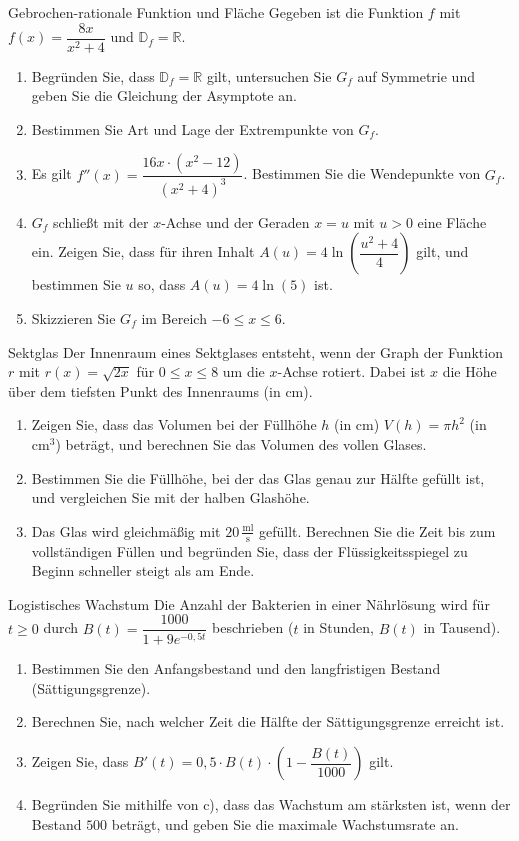 \begin{uebung}{Gebrochen-rationale Funktion und Fläche}
Gegeben ist die Funktion $f$ mit $f(x) = \dfrac{8x}{x^2+4}$ und $\mathds{D}_f = \mathds{R}$.
\begin{enumerate}[label=\alph*)]
  \item Begründen Sie, dass $\mathds{D}_f = \mathds{R}$ gilt, untersuchen Sie $G_f$ auf Symmetrie und geben Sie die Gleichung der Asymptote an.
  \item Bestimmen Sie Art und Lage der Extrempunkte von $G_f$.
  \item Es gilt $f''(x) = \dfrac{16x\cdot(x^2-12)}{(x^2+4)^3}$. Bestimmen Sie die Wendepunkte von $G_f$.
  \item $G_f$ schließt mit der $x$-Achse und der Geraden $x=u$ mit $u>0$ eine Fläche ein. Zeigen Sie, dass für ihren Inhalt $A(u) = 4\ln{\left(\dfrac{u^2+4}{4}\right)}$ gilt, und bestimmen Sie $u$ so, dass $A(u) = 4\ln{(5)}$ ist.
  \item Skizzieren Sie $G_f$ im Bereich $-6\leq x\leq 6$.
\end{enumerate}
\end{uebung}

\begin{uebung}{Sektglas}
Der Innenraum eines Sektglases entsteht, wenn der Graph der Funktion $r$ mit $r(x) = \sqrt{2x}$ für $0\leq x\leq 8$ um die $x$-Achse rotiert. Dabei ist $x$ die Höhe über dem tiefsten Punkt des Innenraums (in cm).
\begin{enumerate}[label=\alph*)]
  \item Zeigen Sie, dass das Volumen bei der Füllhöhe $h$ (in cm) $V(h) = \pi h^2$ (in $\text{cm}^3$) beträgt, und berechnen Sie das Volumen des vollen Glases.
  \item Bestimmen Sie die Füllhöhe, bei der das Glas genau zur Hälfte gefüllt ist, und vergleichen Sie mit der halben Glashöhe.
  \item Das Glas wird gleichmäßig mit $20\,\frac{\text{ml}}{\text{s}}$ gefüllt. Berechnen Sie die Zeit bis zum vollständigen Füllen und begründen Sie, dass der Flüssigkeitsspiegel zu Beginn schneller steigt als am Ende.
\end{enumerate}
\end{uebung}

\begin{uebung}{Logistisches Wachstum}
Die Anzahl der Bakterien in einer Nährlösung wird für $t\geq 0$ durch $B(t) = \dfrac{1000}{1+9e^{-0{,}5t}}$ beschrieben ($t$ in Stunden, $B(t)$ in Tausend).
\begin{enumerate}[label=\alph*)]
  \item Bestimmen Sie den Anfangsbestand und den langfristigen Bestand (Sättigungsgrenze).
  \item Berechnen Sie, nach welcher Zeit die Hälfte der Sättigungsgrenze erreicht ist.
  \item Zeigen Sie, dass $B'(t) = 0{,}5\cdot B(t)\cdot\left(1-\dfrac{B(t)}{1000}\right)$ gilt.
  \item Begründen Sie mithilfe von c), dass das Wachstum am stärksten ist, wenn der Bestand $500$ beträgt, und geben Sie die maximale Wachstumsrate an.
\end{enumerate}
\end{uebung}


